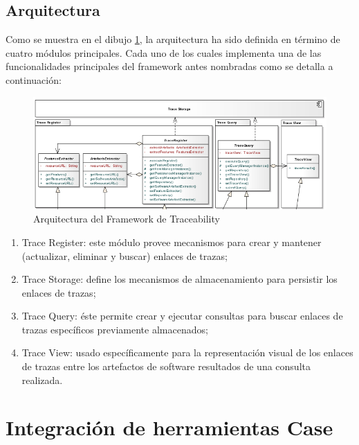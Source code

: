 \documentclass[a4paper,12pt,oneside]{book}
\begin{document}
\subsection{Arquitectura}

Como se muestra en el dibujo \ref{fig:SPLArquitectura}, la arquitectura ha sido definida en término de cuatro módulos principales. Cada uno de los cuales implementa una de las funcionalidades principales del framework antes nombradas como se detalla a continuación:

\begin{figure}[hbtp]
\centering
\includegraphics[scale=.55]{./img/ArquitecturaTraceabilityFramework}
\caption{Arquitectura del Framework de Traceability}
\label{fig:SPLArquitectura}
\end{figure}

\begin{enumerate}
\item    Trace Register: este módulo provee mecanismos para crear y mantener (actualizar, eliminar y buscar) enlaces de trazas;
\item     Trace Storage: define los mecanismos de almacenamiento para persistir los enlaces de trazas;
\item     Trace Query: éste permite crear y ejecutar consultas para buscar enlaces de trazas específicos previamente almacenados;
\item     Trace View: usado específicamente para la representación visual de los enlaces de trazas entre los artefactos de software resultados de una consulta realizada.
\end{enumerate}


\section{Integración de herramientas Case}
\end{document}
